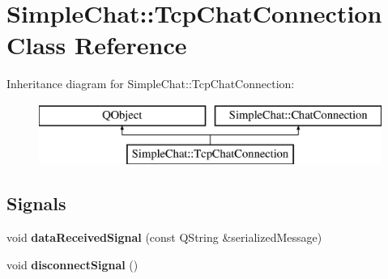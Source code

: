 \hypertarget{classSimpleChat_1_1TcpChatConnection}{\section{Simple\-Chat\-:\-:Tcp\-Chat\-Connection Class Reference}
\label{classSimpleChat_1_1TcpChatConnection}
}
Inheritance diagram for Simple\-Chat\-:\-:Tcp\-Chat\-Connection\-:\begin{figure}[H]
\begin{center}
\leavevmode
\includegraphics[height=2.000000cm]{classSimpleChat_1_1TcpChatConnection}
\end{center}
\end{figure}
\subsection*{Signals}
\begin{DoxyCompactItemize}
\item 
\hypertarget{classSimpleChat_1_1TcpChatConnection_acbd9d95bf1f80fd1c8325fb0e2d1655c}{void {\bfseries data\-Received\-Signal} (const Q\-String \&serialized\-Message)}\label{classSimpleChat_1_1TcpChatConnection_acbd9d95bf1f80fd1c8325fb0e2d1655c}

\item 
\hypertarget{classSimpleChat_1_1TcpChatConnection_a4950d5863fce3c72f8f0e4972b2f824f}{void {\bfseries disconnect\-Signal} ()}\label{classSimpleChat_1_1TcpChatConnection_a4950d5863fce3c72f8f0e4972b2f824f}

\end{DoxyCompactItemize}
